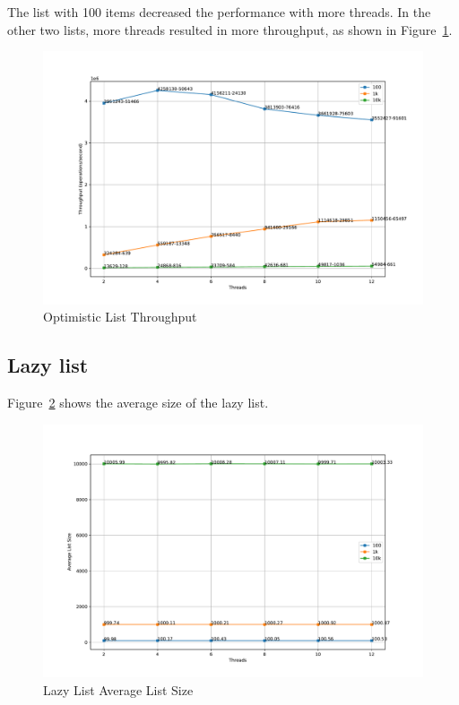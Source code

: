 \documentclass{article}
\begin{document}
The list with 100 items decreased the performance with more threads. In the other two lists, more threads resulted in more throughput, as shown in Figure~\ref{fig:optimistic-throughput}.

\begin{figure}[H]
    \centering
    \includegraphics[width=\textwidth]{../test/plots/OptimisticListThroughput.pdf}
    \caption{Optimistic List Throughput}
    \label{fig:optimistic-throughput}
\end{figure}

\subsection{Lazy list}

Figure~\ref{fig:lazy-size} shows the average size of the lazy list.

\begin{figure}[H]
    \centering
    \includegraphics[scale=0.3]{../test/plots/LazyListAverageListSize.pdf}
    \caption{Lazy List Average List Size}
    \label{fig:lazy-size}
\end{figure}
\end{document}
